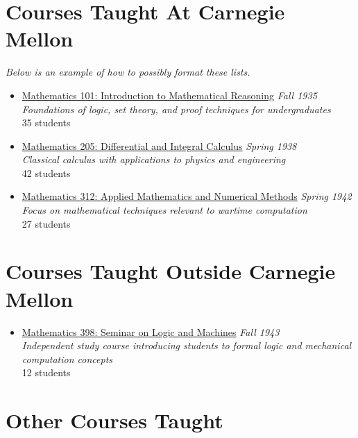 \documentclass[11pt]{report}
\newcommand{\dates}[1]{\hfill \textit{#1}}
\begin{document}
\newcommand{\crsNote}[1]{\tabto{6.1cm}[#1]}

\section{Courses Taught At Carnegie Mellon}

\textit{Below is an example of how to possibly format these lists.}
\begin{itemize}

\item
  \href{https://www.vassar.edu/}
  {Mathematics 101: Introduction to Mathematical Reasoning}
  \dates{Fall 1935}\\
  \emph{Foundations of logic, set theory, and proof techniques for undergraduates}\\
  35 students

\item
  \href{https://www.vassar.edu/}
  {Mathematics 205: Differential and Integral Calculus}
  \dates{Spring 1938}\\
  \emph{Classical calculus with applications to physics and engineering}\\
  42 students

\item
  \href{https://www.vassar.edu/}
  {Mathematics 312: Applied Mathematics and Numerical Methods}
  \dates{Spring 1942}\\
  \emph{Focus on mathematical techniques relevant to wartime computation}\\
  27 students

\end{itemize}

\section{Courses Taught Outside Carnegie Mellon}

\begin{itemize}

\item
  \href{https://www.vassar.edu/}
  {Mathematics 398: Seminar on Logic and Machines}
  \dates{Fall 1943}\\
  \emph{Independent study course introducing students to formal logic and mechanical computation concepts}\\
  12 students

\end{itemize}

\section{Other Courses Taught}
\end{document}

